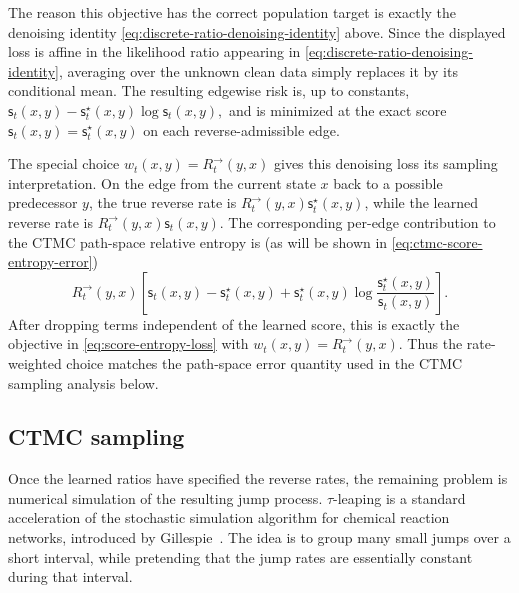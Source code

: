 \documentclass[10pt,a4paper]{amsart}
\numberwithin{equation}{section}
\newcommand{\sstar}{\mathsf{s}^{\star}}
\newcommand{\score}{\mathsf{s}}
\begin{document}
The reason this objective has the correct population target is exactly the
denoising identity \eqref{eq:discrete-ratio-denoising-identity} above.
Since the displayed loss is affine in the likelihood ratio appearing in \eqref{eq:discrete-ratio-denoising-identity}, averaging
over the unknown clean data simply replaces it by its conditional mean.  The
resulting edgewise risk is, up to constants,
$
    \score_t(x,y)
    -
    \sstar_t(x,y)\log \score_t(x,y),
$
and is minimized at the exact score
$\score_t(x,y)=\sstar_t(x,y)$ on each reverse-admissible edge.

The special choice $w_t(x,y)=R_t^{\to}(y,x)$ gives this denoising loss its
sampling interpretation.  On the edge from the current state $x$ back to a possible
predecessor $y$, the true reverse rate is
$R_t^{\to}(y,x)\sstar_t(x,y)$, while the learned reverse rate is
$R_t^{\to}(y,x)\score_t(x,y)$.  The corresponding per-edge contribution to the
CTMC path-space relative entropy is (as will be shown in \eqref{eq:ctmc-score-entropy-error})
\[
    R_t^{\to}(y,x)\left[
    \score_t(x,y)
    -
    \sstar_t(x,y)
    +
    \sstar_t(x,y)
    \log
    \frac{\sstar_t(x,y)}{\score_t(x,y)}
    \right].
\]
After dropping terms independent of the learned score, this is exactly the
objective in \eqref{eq:score-entropy-loss} with $w_t(x,y)=R_t^{\to}(y,x)$.  Thus
the rate-weighted choice matches the path-space error quantity used in the CTMC
sampling analysis below.

\subsection{CTMC sampling}
\label{subsec:ctmc-sampling}

Once the learned ratios have specified the reverse rates, the remaining problem
is numerical simulation of the resulting jump process.
$\tau$-leaping is a standard acceleration of the stochastic simulation
algorithm for chemical reaction networks, introduced by
Gillespie~\cite{gillespie2001tau}.  The idea is to group many small jumps over a
short interval, while pretending that the jump rates are essentially constant
during that interval.
\end{document}
